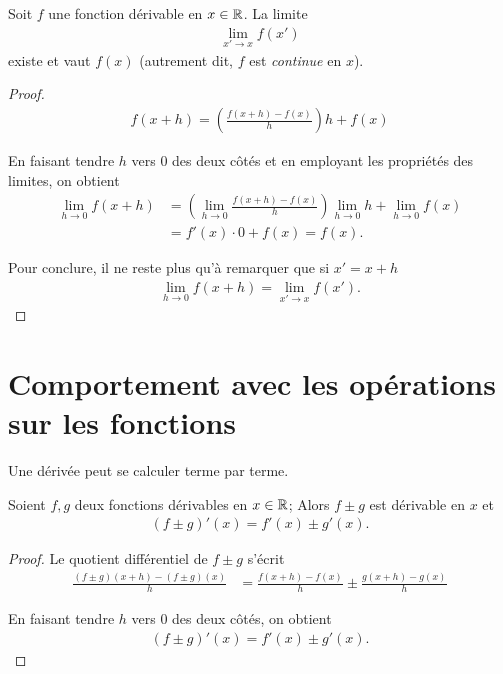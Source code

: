 \documentclass[main.tex]{subfiles}
\begin{document}
\begin{proposition}

    Soit $f$ une fonction dérivable en $x \in \mathbb{R}$.
    La limite
    \begin{align}
        \lim_{x' \to x} f(x')
    \end{align}
    existe et vaut $f(x)$
    (autrement dit, $f$ est \emph{continue} en $x$).
\end{proposition}
\begin{proof}
    \begin{align}
        f(x + h) = \left(\frac {f(x + h) - f(x)} h\right) h + f(x)
    \end{align}

    En faisant tendre $h$ vers $0$ des deux côtés
    et en employant les propriétés des limites,
    on obtient
    \begin{align}
        \lim_{h \to 0} f(x + h)
        &= \left(\lim_{h \to 0} \frac {f(x + h) - f(x)} h\right) \lim_{h \to 0} h + \lim_{h \to 0} f(x)\\
        &= f'(x) \cdot 0 + f(x) = f(x).
    \end{align}

    Pour conclure, il ne reste plus qu'à remarquer que si $x' = x + h$
    \begin{align}
        \lim_{h \to 0} f(x + h) = \lim_{x' \to x} f(x').
    \end{align}
\end{proof}

\section{Comportement avec les opérations sur les fonctions}

Une dérivée peut se calculer terme par terme.

\begin{proposition}

    Soient $f, g$ deux fonctions dérivables en $x \in \mathbb{R}$;
    Alors $f \pm g$ est dérivable en $x$ et
    \begin{align}
        (f \pm g)'(x) = f'(x) \pm g'(x).
    \end{align}
\end{proposition}
\begin{proof}
    Le quotient différentiel de $f \pm g$ s'écrit
    \begin{align}
        \frac {(f \pm g)(x + h) - (f \pm g)(x)} h
        &= \frac {f(x + h) - f(x)} h \pm \frac {g(x + h) - g(x)} h
    \end{align}

    En faisant tendre $h$ vers $0$ des deux côtés,
    on obtient
    \begin{align}
        (f \pm g)'(x) = f'(x) \pm g'(x).
    \end{align}
\end{proof}
\end{document}
